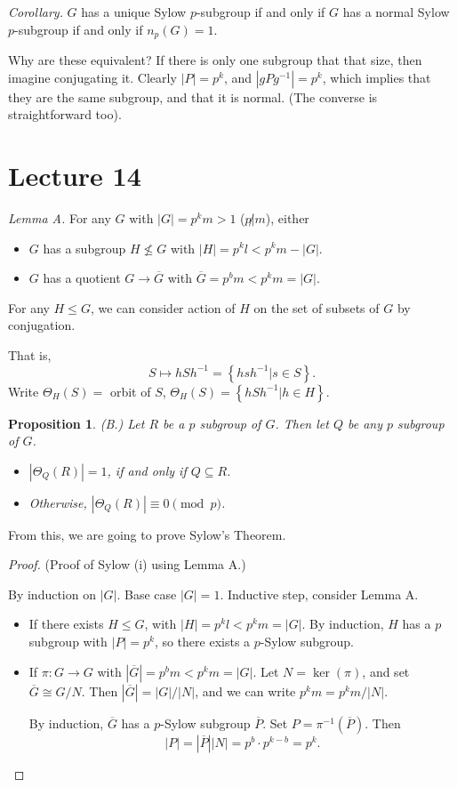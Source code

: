 \documentclass[12pt]{article}
\newtheorem*{prop}{Proposition}
\newcommand{\ol}{\overline}
\begin{document}
  {\it Corollary.} $G$ has a unique Sylow $p$-subgroup if and only if $G$ has a normal Sylow $p$-subgroup if and only if $n_p(G) = 1$.

  Why are these equivalent?  If there is only one subgroup that that size, then imagine conjugating it.  Clearly $|P| = p^k$, and $|g P g^{-1}| = p^k$, which implies that they are the same subgroup, and that it is normal.  (The converse is straightforward too).


  \section{Lecture 14}

  {\it Lemma A.} For any $G$ with $|G| = p^k m > 1$ ($p \not | m$), either
  \begin{itemize}
    \item $G$ has a subgroup $H \not \leq G$ with $|H| = p^k l < p^k m - |G|$.
    \item $G$ has a quotient $G \to \ol{G}$ with $\ol{G} = p^b m < p^k m = |G|$.
  \end{itemize}


  For any $H \leq G$, we can consider action of $H$ on the set of subsets of $G$ by conjugation.

  That is,
  \[
    S \mapsto hSh^{-1} = \left\{ h s h^{-1} | s \in S \right\}.
  \]
  Write $\Theta_H(S) = $ orbit of $S$, $\Theta_H(S) = \left\{ h S h^{-1} | h \in H \right\}$.

  \begin{prop}(B.)
  Let $R$ be a $p$ subgroup of $G$.  Then let $Q$ be any $p$ subgroup of $G$.
  \begin{itemize}
    \item $|\Theta_Q(R)| = 1$, if and only if $Q \subseteq R$.
    \item Otherwise, $|\Theta_Q(R)| \equiv 0 \pmod{p}$.
  \end{itemize}
\end{prop}

From this, we are going to prove Sylow's Theorem.

\begin{proof}
  (Proof of Sylow (i) using Lemma A.)

  By induction on $|G|$. Base case $|G| = 1$.  Inductive step, consider Lemma A.

  \begin{itemize}
    \item If there exists $H \leq G$, with $|H| = p^k l < p^k m = |G|$.  By induction, $H$ has a $p$ subgroup with $|P| = p^k$, so there exists a $p$-Sylow subgroup.
    \item If $\pi: G \to G$ with $|\ol{G}| = p^b m < p^k m = |G|$.  Let $N = \ker(\pi)$, and set $\ol{G} \cong G / N$.  Then $|\ol{G}| = |G| / |N|$, and we can write $p^k m  = p^k m / |N|$.

      By induction, $\ol{G}$ has a $p$-Sylow subgroup $\ol{P}$.  Set $P = \pi^{-1}(\ol{P})$.  Then
      \[
        |P| = |\ol{P}| |N| = p^b \cdot p^{k-b} = p^k.
      \]
  \end{itemize}
\end{proof}
\end{document}
